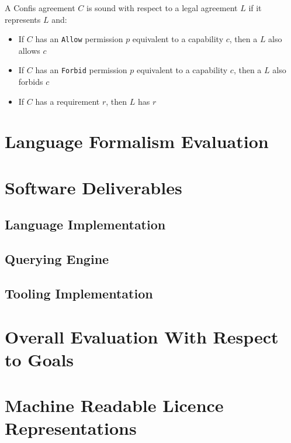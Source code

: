 \begin{definition}[Soundness]
    \label{def:soundness}
    A Confis agreement $C$ is sound with respect to a legal agreement $L$ if it represents $L$ and:

    \begin{itemize}
        \item If $C$ has an \texttt{Allow} permission $p$ equivalent to a capability $c$, then a $L$ also allows $c$
        \item If $C$ has an \texttt{Forbid} permission $p$ equivalent to a capability $c$, then a $L$ also forbids $c$
        \item If $C$ has a requirement $r$, then $L$ has $r$
    \end{itemize}
\end{definition}

\section{Language Formalism Evaluation}

\section{Software Deliverables}\label{sec:software-deliverables}

\subsection{Language Implementation}

\subsection{Querying Engine}

\subsection{Tooling Implementation}

\section[Overall Evaluation]{Overall Evaluation With Respect to Goals}


\section{Machine Readable Licence Representations}\label{sec:licence-representations}

